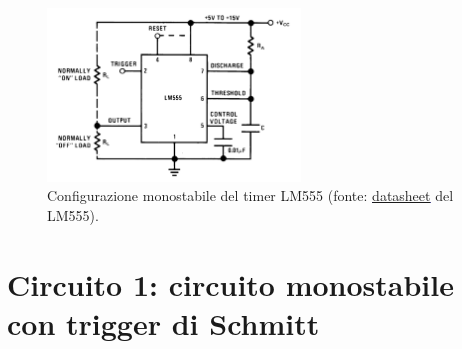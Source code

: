 \documentclass{report}
\begin{document}
\begin{figure}[h]
	\centering
	\includegraphics[height=4.6cm]{immagini/timer3}
	\caption{Configurazione monostabile del timer LM555 (fonte: \textcolor{blue}{\underline{\href{https://www.ti.com/lit/ds/symlink/lm555.pdf?ts=1667144089940&ref_url=https\%253A\%252F\%252Fwww.ti.com\%252Fproduct\%252FLM555}{datasheet}}} del LM555).}
	\label{figura:timer2}
\end{figure}

\newpage
\section{Circuito 1: circuito monostabile con trigger di Schmitt}
\end{document}

